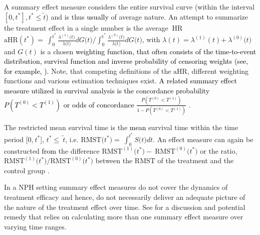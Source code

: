 \documentclass{article}
\newcommand{\NEW}[2][black]{\textcolor{#1}{#2}}
\begin{document}
\noindent %
A summary effect measure considers the entire survival curve (within the interval $[0,t^*], t^*\leq \tilde{t}$) and is thus \NEW{usually} of average nature.
An attempt to summarize the treatment effect in a single number is the average $\mathrm{\ }\text{HR}$ $\text{aHR}(t^*)\mathrm{=\ }{\int^{{\mathrm{t}}^{\mathrm{*}}}_0{\frac{{\lambda }^{\left(\mathrm{1}\right)}\mathrm{(}t\mathrm{)}}{\lambda \mathrm{(}t\mathrm{)}}}dG\mathrm{(}t\mathrm{)}}/{\int^{{\mathrm{t}}^{\mathrm{*}}}_0{\frac{{\lambda }^{\left(0\right)}\mathrm{(}t\mathrm{)}}{\lambda \mathrm{(}t\mathrm{)}}}dG\mathrm{(}t\mathrm{)}}$, with $\lambda \left(t\right)\mathrm{=}{\lambda }^{\left(\mathrm{1}\right)}\left(t\right)\mathrm{+\ }{\lambda }^{\left(0\right)}\mathrm{(}t\mathrm{)}$ and $G\left(t\right)$ is a chosen \NEW{weighting function, that often consists of the time-to-event distribution, survival function and inverse probability of censoring weights (see, for example, \cite{Chen.2015,Schemper.2009,Rauch.2018}).}
Note, that competing definitions of the $\text{aHR}$, different weighting functions and various estimation techniques exist. 
\NEW{A related summary effect measure utilized in survival analysis is the concordance probability $P(T^{(0)}<T^{(1)})$ or odds of concordance $\frac{P(T^{(0)}<T^{(1)})}{1-P(T^{(0)}<T^{(1)})}$ \cite{Schemper.2009,Dunkler.2010,Martinussen.2013}}.

\noindent The restricted mean survival time is the {\NEW{mean}} survival time within the time period [0,$\mathrm{\ }t^{\mathrm{*}}$], $t^{\mathrm{*}}\mathrm{\le }\mathrm{\ }\tilde{t}$, i.e. $\text{RMST}\mathrm{(}t^{\mathrm{*}}\mathrm{)=\ }\int^{t^{\mathrm{*}}}_0{S\mathrm{(}t\mathrm{)}dt}$. 
An effect measure can again be constructed \NEW{from} the difference $\text{RMST}^{\left(\mathrm{1}\right)}\mathrm{(}t^{\mathrm{*}}\mathrm{)-\ }\text{RMST}^{\left(0\right)}\mathrm{(}t^{\mathrm{*}}\mathrm{)}$ or the ratio, ${\text{RMST}^{\left(\mathrm{1}\right)}\mathrm{(}t^{\mathrm{*}}\mathrm{)}}/{\text{RMST}^{\left(0\right)}\mathrm{(}t^{\mathrm{*}}\mathrm{)}}$ between the $\text{RMST}$ of the treatment and the control group \cite{Uno.2014}. 

\noindent In a NPH setting summary effect measures do not cover the dynamics of treatment efficacy and hence, do not necessarily deliver an adequate picture of the nature of the treatment effect over time. See \cite{Dehbi.2017} for a discussion and potential remedy that relies on calculating more than one summary effect measure over varying time ranges. 
\end{document}

